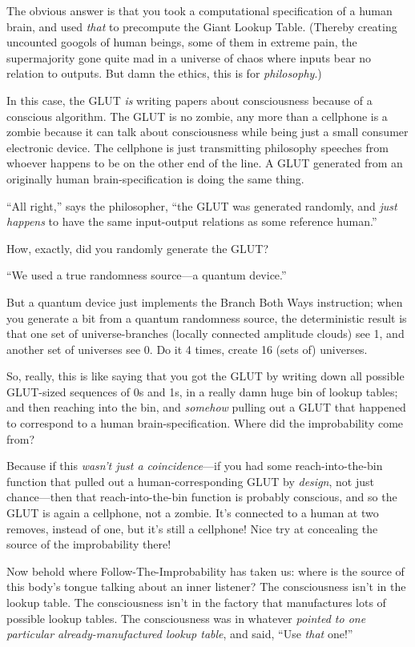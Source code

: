 {
 The obvious answer is that you took a computational specification
of a human brain, and used \textit{that} to precompute the Giant Lookup
Table. (Thereby creating uncounted googols of human beings, some of
them in extreme pain, the supermajority gone quite mad in a universe of
chaos where inputs bear no relation to outputs. But damn the ethics,
this is for \textit{philosophy}.)}

{
 In this case, the GLUT \textit{is} writing papers about
consciousness because of a conscious algorithm. The GLUT is no zombie,
any more than a cellphone is a zombie because it can talk about
consciousness while being just a small consumer electronic device. The
cellphone is just transmitting philosophy speeches from whoever happens
to be on the other end of the line. A GLUT generated from an originally
human brain-specification is doing the same thing.}

{
 ``All right,'' says the
philosopher, ``the GLUT was generated randomly, and
\textit{just happens} to have the same input-output relations as some
reference human.''}

{
 How, exactly, did you randomly generate the GLUT?}

{
 ``We used a true randomness source---a quantum
device.''}

{
 But a quantum device just implements the Branch Both Ways
instruction; when you generate a bit from a quantum randomness source,
the deterministic result is that one set of universe-branches (locally
connected amplitude clouds) see 1, and another set of universes see 0.
Do it 4 times, create 16 (sets of) universes.}

{
 So, really, this is like saying that you got the GLUT by writing
down all possible GLUT-sized sequences of 0s and 1s, in a really damn
huge bin of lookup tables; and then reaching into the bin, and
\textit{somehow} pulling out a GLUT that happened to correspond to a
human brain-specification. Where did the improbability come from?}

{
 Because if this \textit{wasn't just a
coincidence}{}---if you had some reach-into-the-bin function that
pulled out a human-corresponding GLUT by \textit{design}, not just
chance---then that reach-into-the-bin function is probably conscious,
and so the GLUT is again a cellphone, not a zombie.
It's connected to a human at two removes, instead of
one, but it's still a cellphone! Nice try at concealing
the source of the improbability there!}

{
 Now behold where Follow-The-Improbability has taken us: where is
the source of this body's tongue talking about an inner
listener? The consciousness isn't in the lookup table.
The consciousness isn't in the factory that
manufactures lots of possible lookup tables. The consciousness was in
whatever \textit{pointed to one particular already-manufactured lookup
table}, and said, ``Use \textit{that}
one!''}

